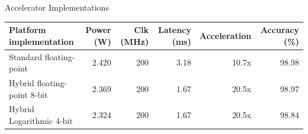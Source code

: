 \begin{frame}[shrink=25]{Accelerator Implementations} %
	\begin{threeparttable}
		\centering
		\caption{\scriptsize Accelerator implementations.}
		\scriptsize %
		\begin{tabular}{lrrrrr}
			\toprule
			\textbf{Platform implementation} & \textbf{Power (W)} & \textbf{Clk (MHz)} & \textbf{Latency (ms)} & \textbf{Acceleration} & \textbf{Accuracy (\%)} \\
			\midrule
			Standard floating-point & 2.420 & 200 & 3.18 & 10.7x & 98.98 \\
			Hybrid floating-point 8-bit & 2.369 & 200 & 1.67 & 20.5x & 98.97 \\
			Hybrid Logarithmic 4-bit  & 2.324 & 200 & 1.67 & 20.5x & 98.84 \\
			\bottomrule
		\end{tabular}
	\end{threeparttable}

\end{frame}